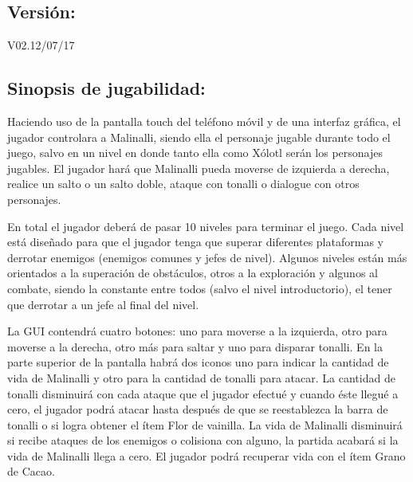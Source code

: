 \documentclass[11pt,letterpaper]{article}
\begin{document}
    	\subsection{Versión:} V02.12/07/17
   		\subsection{Sinopsis de jugabilidad:} 
 Haciendo uso de la pantalla touch del teléfono móvil y de una interfaz gráfica, el jugador controlara a Malinalli, siendo ella el personaje jugable durante todo el juego, salvo en un nivel en donde tanto ella como Xólotl serán los personajes jugables.   El jugador hará que Malinalli pueda moverse de izquierda a derecha, realice un salto o un salto doble, ataque con tonalli o dialogue con otros personajes.
\\
\par
En total el jugador deberá de pasar 10 niveles para terminar el juego. Cada nivel está diseñado para que el jugador tenga que superar diferentes plataformas y derrotar enemigos (enemigos comunes y jefes de nivel). Algunos niveles están más orientados a la superación de obstáculos, otros a la exploración y algunos al combate, siendo la constante entre todos (salvo el nivel introductorio), el tener que derrotar a un jefe al final del nivel.
\\
\par
La GUI contendrá cuatro botones: uno para moverse a la izquierda, otro para moverse a la derecha, otro más para saltar y uno para disparar tonalli. En la parte superior de la pantalla habrá dos iconos uno para indicar la cantidad de vida de Malinalli y otro para la cantidad de tonalli para atacar. La cantidad de tonalli disminuirá con cada ataque que el jugador efectué y cuando éste llegué a cero, el jugador podrá atacar hasta después de que se reestablezca la barra de tonalli o si logra obtener el ítem Flor de vainilla. La vida de Malinalli disminuirá si recibe ataques de los enemigos o colisiona con alguno, la partida acabará si la vida de Malinalli llega a cero. El jugador podrá recuperar vida con el ítem Grano de Cacao.
  		
\end{document}

